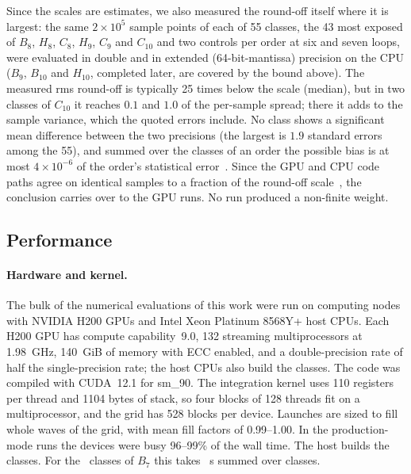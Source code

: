 Since the scales are estimates, we also measured the round-off itself where it is largest: the same $2\times10^{5}$
sample points of each of 55 classes, the 43 most exposed of $B_8$, $H_8$, $C_8$, $H_9$, $C_9$ and $C_{10}$ and two
controls per order at six and seven loops, were evaluated in double and in extended (64-bit-mantissa) precision on the
CPU ($B_9$, $B_{10}$ and $H_{10}$, completed later, are covered by the bound above). The measured rms round-off is
typically 25 times below the scale (median), but in two classes of $C_{10}$ it reaches $0.1$ and $1.0$ of the
per-sample spread; there it adds to the sample variance, which the quoted errors include. No class shows a significant
mean difference between the two precisions (the largest is $1.9$ standard errors among the 55), and summed over the
classes of an order the possible bias is at most $4\times10^{-6}$ of the order's statistical error~. Since
the GPU and CPU code paths agree on identical samples to a fraction of the round-off scale~, the conclusion
carries over to the GPU runs. No run produced a non-finite weight.

\subsection{Performance}
\label{sec:results-performance}

\paragraph{Hardware and kernel.}
The bulk of the numerical evaluations of this work were run on computing nodes with NVIDIA H200 GPUs and Intel Xeon
Platinum 8568Y+ host CPUs. Each H200 GPU has compute capability~9.0, 132 streaming multiprocessors at 1.98~GHz, 140~GiB of memory with ECC enabled,
and a double-precision rate of half the single-precision rate; the host CPUs also build the classes. The code was compiled with CUDA~12.1 for sm\_90. The
integration kernel uses 110 registers per thread and 1104 bytes of stack, so four blocks of 128 threads fit on a
multiprocessor, and the grid has 528 blocks per device. Launches are sized to fill whole waves of the grid, with mean
fill factors of 0.99--1.00. In the production-mode runs the devices were busy
96--99\% of the wall time. The host builds the classes. For the \nclBseven\ classes of $B_7$ this takes
~s summed over classes.

